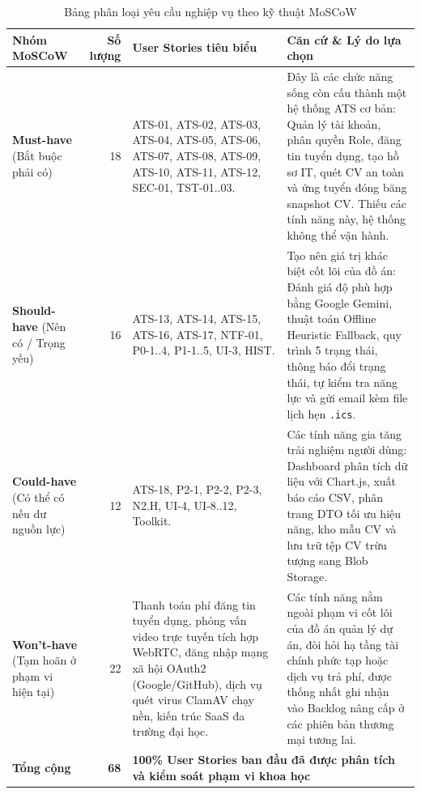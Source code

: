 \begin{table}[htbp]
\centering
\small
\caption{Bảng phân loại yêu cầu nghiệp vụ theo kỹ thuật MoSCoW}
\label{tab:moscow-summary}
\begin{tabularx}{\textwidth}{l r p{5.5cm} X}
\toprule
\textbf{Nhóm MoSCoW} & \textbf{Số lượng} & \textbf{User Stories tiêu biểu} & \textbf{Căn cứ \& Lý do lựa chọn} \\
\midrule
\textbf{Must-have} \newline (Bắt buộc phải có) & 18 & ATS-01, ATS-02, ATS-03, ATS-04, ATS-05, ATS-06, ATS-07, ATS-08, ATS-09, ATS-10, ATS-11, ATS-12, SEC-01, TST-01..03. & Đây là các chức năng sống còn cấu thành một hệ thống ATS cơ bản: Quản lý tài khoản, phân quyền Role, đăng tin tuyển dụng, tạo hồ sơ IT, quét CV an toàn và ứng tuyển đóng băng snapshot CV. Thiếu các tính năng này, hệ thống không thể vận hành. \\
\addlinespace
\textbf{Should-have} \newline (Nên có / Trọng yếu) & 16 & ATS-13, ATS-14, ATS-15, ATS-16, ATS-17, NTF-01, P0-1..4, P1-1..5, UI-3, HIST. & Tạo nên giá trị khác biệt cốt lõi của đồ án: Đánh giá độ phù hợp bằng Google Gemini, thuật toán Offline Heuristic Fallback, quy trình 5 trạng thái, thông báo đổi trạng thái, tự kiểm tra năng lực và gửi email kèm file lịch hẹn \texttt{.ics}. \\
\addlinespace
\textbf{Could-have} \newline (Có thể có nếu dư nguồn lực) & 12 & ATS-18, P2-1, P2-2, P2-3, N2.H, UI-4, UI-8..12, Toolkit. & Các tính năng gia tăng trải nghiệm người dùng: Dashboard phân tích dữ liệu với Chart.js, xuất báo cáo CSV, phân trang DTO tối ưu hiệu năng, kho mẫu CV và lưu trữ tệp CV trừu tượng sang Blob Storage. \\
\addlinespace
\textbf{Won't-have} \newline (Tạm hoãn ở phạm vi hiện tại) & 22 & Thanh toán phí đăng tin tuyển dụng, phỏng vấn video trực tuyến tích hợp WebRTC, đăng nhập mạng xã hội OAuth2 (Google/GitHub), dịch vụ quét virus ClamAV chạy nền, kiến trúc SaaS đa trường đại học. & Các tính năng nằm ngoài phạm vi cốt lõi của đồ án quản lý dự án, đòi hỏi hạ tầng tài chính phức tạp hoặc dịch vụ trả phí, được thống nhất ghi nhận vào Backlog nâng cấp ở các phiên bản thương mại tương lai. \\
\midrule
\textbf{Tổng cộng} & \textbf{68} & \multicolumn{2}{l}{\textbf{100\% User Stories ban đầu đã được phân tích và kiểm soát phạm vi khoa học}} \\
\bottomrule
\end{tabularx}
\end{table}

